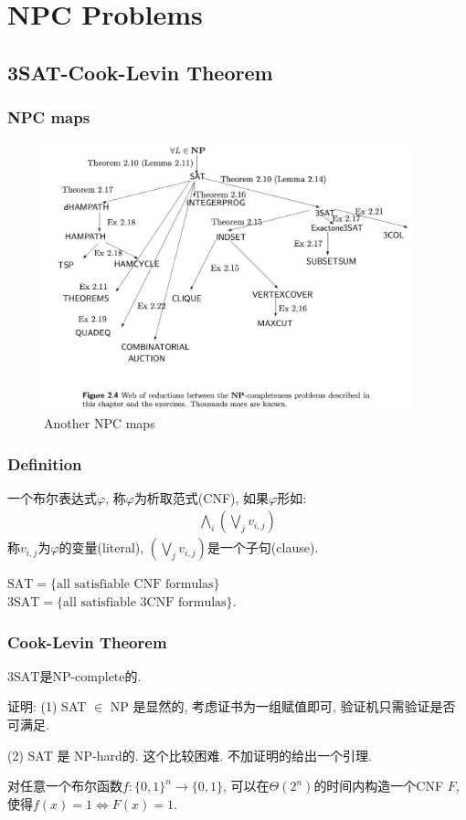 \section{NPC Problems}
\subsection{3SAT-Cook-Levin Theorem}
\begin{frame}
    \frametitle{NPC maps}
    \begin{figure}[H]
        \centering
        \includegraphics[width=0.95\textwidth]{images/a.png}
        \caption{Another NPC maps}
    \end{figure}
\end{frame}
\begin{frame}
    \frametitle{Definition}
    \begin{definition}
        一个布尔表达式$\varphi$, 称$\varphi$为析取范式(CNF), 如果$\varphi$形如:
        \begin{align*}
            \bigwedge_i\left(\bigvee_j v_{i,j}\right)
        \end{align*}
        称$v_{i,j}$为$\varphi$的变量(literal), $(\bigvee_j v_{i,j})$是一个子句(clause).
    \end{definition}
    \pause
    \begin{definition}
        $\text{SAT} = \{\text{all satisfiable CNF formulas}\}$ \\
        $\text{3SAT} = \{\text{all satisfiable 3CNF formulas}\}$.
    \end{definition}
\end{frame}
\begin{frame}
    \frametitle{Cook-Levin Theorem}
    \begin{theorem}
        $\text{3SAT}$是NP-complete的.
    \end{theorem}
    证明: (1) SAT $\in$ NP 是显然的, 考虑证书为一组赋值即可, 验证机只需验证是否可满足.

    (2) SAT 是 NP-hard的. 这个比较困难. 不加证明的给出一个引理.
    \begin{lemma}
        对任意一个布尔函数$f:\{0,1\}^n \rightarrow \{0,1\}$, 可以在$\Theta(2^n)$的时间内构造一个CNF $F$, 使得$f(x) = 1 \iff F(x) = 1$.
    \end{lemma} 
\end{frame}


